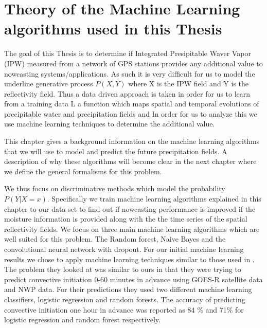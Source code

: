 \documentclass[proposal]{umassthesis}
\begin{document}
\chapter{Theory of the Machine Learning algorithms used in this Thesis}

The goal of this Thesis is to determine if Integrated Presipitable Waver Vapor (IPW) measured from a network of GPS stations provides any additional value to nowcasting systems/applications. As such it is very difficult for us to model the underline generative process $P(X,Y)$ where X is the IPW field and Y is the reflectivity field. Thus a data driven approach is taken in order for us to learn from a training data L a function which maps spatial and temporal evolutions of precipitable water and precipitation fields and  In order for us to analyze this we use machine learning techniques to determine the additional value. 

This chapter gives a background information on the machine learning algorithms that we will use to model and predict the future precipitation fields. A description of why these algorithms will become clear in the next chapter where we define the general formalisms for this problem. 

We thus focus on discriminative methods which model the probability $P(Y | X = x)$. 
Specifically we train machine learning algorithms explained in this chapter to our data set to find out if nowcasting performance is improved if the moisture information is provided along with the the time series of the spatial reflectivity fields. We focus on three main machine learning algorithms which are well suited for this problem. The Random forest, Naive Bayes and the convolutional neural network with dropout. 
For our initial machine learning results we chose to apply machine learning techniques similar to those used in \cite{mecikalski2015probabilistic}. The problem they looked at was similar to ours in that they were trying to predict convective initiation 0-60 minutes in advance using GOES-R satellite data and NWP data. For their predictions they used two different machine learning classifiers, logistic regression and random forests. The accuracy of predicting convective initiation one hour in advance was reported as 84 \% and 71\% for logistic regression and random forest respectively.
\end{document}
